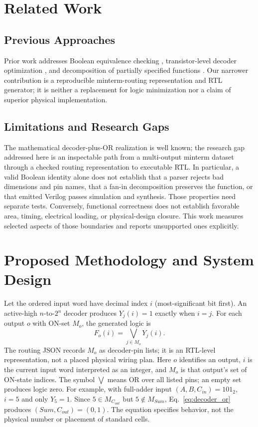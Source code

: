 \documentclass[runningheads]{llncs}
\begin{document}
\section{Related Work}
\subsection{Previous Approaches}
Prior work addresses Boolean equivalence checking \cite{b3}, transistor-level decoder optimization \cite{b2}, and decomposition of partially specified functions \cite{b1}. Our narrower contribution is a reproducible minterm-routing representation and RTL generator; it is neither a replacement for logic minimization nor a claim of superior physical implementation.

\subsection{Limitations and Research Gaps}
The mathematical decoder-plus-OR realization is well known; the research gap addressed here is an inspectable path from a multi-output minterm dataset through a checked routing representation to executable RTL. In particular, a valid Boolean identity alone does not establish that a parser rejects bad dimensions and pin names, that a fan-in decomposition preserves the function, or that emitted Verilog passes simulation and synthesis. Those properties need separate tests. Conversely, functional correctness does not establish favorable area, timing, electrical loading, or physical-design closure. This work measures selected aspects of those boundaries and reports unsupported ones explicitly.

\section{Proposed Methodology and System Design}
Let the ordered input word have decimal index $i$ (most-significant bit first). An active-high $n$-to-$2^n$ decoder produces $Y_j(i)=1$ exactly when $i=j$. For each output $o$ with ON-set $M_o$, the generated logic is
\begin{equation}
F_o(i)=\bigvee_{j\in M_o}Y_j(i).
\label{eq:decoder_or}
\end{equation}
The routing JSON records $M_o$ as decoder-pin lists; it is an RTL-level representation, not a placed physical wiring plan.
Here $o$ identifies an output, $i$ is the current input word interpreted as an integer, and $M_o$ is that output's set of ON-state indices. The symbol $\bigvee$ means OR over all listed pins; an empty set produces logic zero. For example, with full-adder input $(A,B,C_{in})=101_2$, $i=5$ and only $Y_5=1$. Since $5\in M_{C_{out}}$ but $5\notin M_{Sum}$, Eq.~\eqref{eq:decoder_or} produces $(Sum,C_{out})=(0,1)$. The equation specifies behavior, not the physical number or placement of standard cells.
\end{document}
